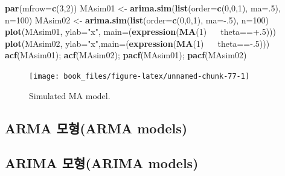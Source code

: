 \documentclass[b5paper,]{scrbook}
\makeatletter
\newenvironment{Shaded}{\begin{snugshade}}{\end{snugshade}}
\newcommand{\KeywordTok}[1]{\textcolor[rgb]{0.13,0.29,0.53}{\textbf{{#1}}}}
\newcommand{\DataTypeTok}[1]{\textcolor[rgb]{0.13,0.29,0.53}{{#1}}}
\newcommand{\DecValTok}[1]{\textcolor[rgb]{0.00,0.00,0.81}{{#1}}}
\newcommand{\StringTok}[1]{\textcolor[rgb]{0.31,0.60,0.02}{{#1}}}
\newcommand{\ErrorTok}[1]{\textcolor[rgb]{0.64,0.00,0.00}{\textbf{{#1}}}}
\newcommand{\NormalTok}[1]{{#1}}
\theoremstyle{plain}
\theoremstyle{definition}
\numberwithin{equation}{section}
\newenvironment{kframe}{%
\medskip{}
\setlength{\fboxsep}{.8em}
 \def\at@end@of@kframe{}%
 \ifinner\ifhmode%
  \def\at@end@of@kframe{\end{minipage}}%
  \begin{minipage}{\columnwidth}%
 \fi\fi%
 \def\FrameCommand##1{\hskip\@totalleftmargin \hskip-\fboxsep
 \colorbox{shadecolor}{##1}\hskip-\fboxsep
     \hskip-\linewidth \hskip-\@totalleftmargin \hskip\columnwidth}%
 \MakeFramed {\advance\hsize-\width
   \@totalleftmargin\z@ \linewidth\hsize
   \@setminipage}}%
 {\par\unskip\endMakeFramed%
 \at@end@of@kframe}
\renewenvironment{Shaded}{\begin{kframe}}{\end{kframe}}
\makeatother
\begin{document}
\begin{Shaded}
\begin{Highlighting}[]
\KeywordTok{par}\NormalTok{(}\DataTypeTok{mfrow=}\KeywordTok{c}\NormalTok{(}\DecValTok{3}\NormalTok{,}\DecValTok{2}\NormalTok{))   }
\NormalTok{MAsim01 <-}\StringTok{ }\KeywordTok{arima.sim}\NormalTok{(}\KeywordTok{list}\NormalTok{(}\DataTypeTok{order=}\KeywordTok{c}\NormalTok{(}\DecValTok{0}\NormalTok{,}\DecValTok{0}\NormalTok{,}\DecValTok{1}\NormalTok{), }\DataTypeTok{ma=}\NormalTok{.}\DecValTok{5}\NormalTok{), }\DataTypeTok{n=}\DecValTok{100}\NormalTok{)}
\NormalTok{MAsim02 <-}\StringTok{ }\KeywordTok{arima.sim}\NormalTok{(}\KeywordTok{list}\NormalTok{(}\DataTypeTok{order=}\KeywordTok{c}\NormalTok{(}\DecValTok{0}\NormalTok{,}\DecValTok{0}\NormalTok{,}\DecValTok{1}\NormalTok{), }\DataTypeTok{ma=}\NormalTok{-.}\DecValTok{5}\NormalTok{), }\DataTypeTok{n=}\DecValTok{100}\NormalTok{)}
\KeywordTok{plot}\NormalTok{(MAsim01, }\DataTypeTok{ylab=}\StringTok{"x"}\NormalTok{, }\DataTypeTok{main=}\NormalTok{(}\KeywordTok{expression}\NormalTok{(}\KeywordTok{MA}\NormalTok{(}\DecValTok{1}\NormalTok{)~}\ErrorTok{~~}\NormalTok{theta==+.}\DecValTok{5}\NormalTok{)))    }
\KeywordTok{plot}\NormalTok{(MAsim02, }\DataTypeTok{ylab=}\StringTok{"x"}\NormalTok{,}\DataTypeTok{main=}\NormalTok{(}\KeywordTok{expression}\NormalTok{(}\KeywordTok{MA}\NormalTok{(}\DecValTok{1}\NormalTok{)~}\ErrorTok{~~}\NormalTok{theta==-.}\DecValTok{5}\NormalTok{))) }
\KeywordTok{acf}\NormalTok{(MAsim01); }\KeywordTok{acf}\NormalTok{(MAsim02); }\KeywordTok{pacf}\NormalTok{(MAsim01); }\KeywordTok{pacf}\NormalTok{(MAsim02)}
\end{Highlighting}
\end{Shaded}

\begin{figure}

{\centering \texttt{[image: book\_files/figure-latex/unnamed-chunk-77-1]} 

}

\caption{Simulated MA model.}\label{fig:unnamed-chunk-77}
\end{figure}

\subsection{ARMA 모형(ARMA models)}\label{arma-arma-models}

\subsection{ARIMA 모형(ARIMA models)}\label{arima-arima-models}
\end{document}
